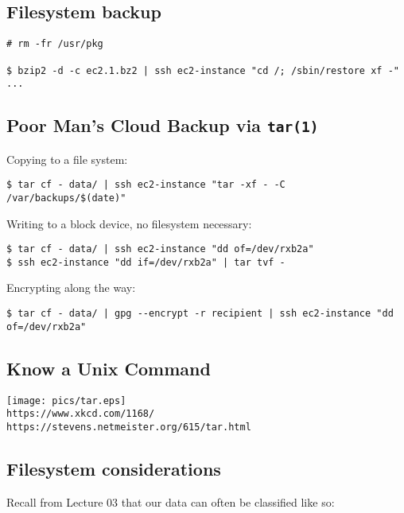 \documentclass[xga]{xdvislides}
\begin{document}
\subsection{Filesystem backup}
\smallish
\begin{verbatim}
# rm -fr /usr/pkg

$ bzip2 -d -c ec2.1.bz2 | ssh ec2-instance "cd /; /sbin/restore xf -"
...
\end{verbatim}


\subsection{Poor Man's Cloud Backup via {\tt tar(1)}}
Copying to a file system:
\begin{verbatim}
$ tar cf - data/ | ssh ec2-instance "tar -xf - -C /var/backups/$(date)"
\end{verbatim}

\vspace{.5in}
Writing to a block device, no filesystem necessary:
\begin{verbatim}
$ tar cf - data/ | ssh ec2-instance "dd of=/dev/rxb2a"
$ ssh ec2-instance "dd if=/dev/rxb2a" | tar tvf -
\end{verbatim}

\vspace{.5in}
Encrypting along the way:
\begin{verbatim}
$ tar cf - data/ | gpg --encrypt -r recipient | ssh ec2-instance "dd of=/dev/rxb2a"
\end{verbatim}

\subsection{Know a Unix Command}
\vspace*{\fill}
\begin{center}
	\texttt{[image: pics/tar.eps]} \\
	\verb+https://www.xkcd.com/1168/+ \\
	\verb+https://stevens.netmeister.org/615/tar.html+
\end{center}
\vspace*{\fill}

\subsection{Filesystem considerations}
Recall from Lecture 03 that our data can often be
classified like so: \\
\end{document}
